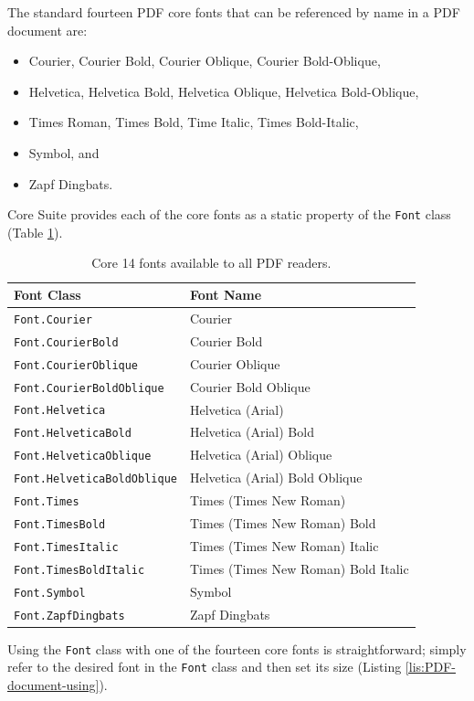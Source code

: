 \documentclass[american,letterpaper]{tufte-book}
\providecommand{\tabularnewline}{\\}
\numberwithin{equation}{section}
\numberwithin{figure}{section}
\begin{document}
{The standard fourteen PDF core fonts that can be referenced by name
in a PDF document are:
\begin{itemize}
\item Courier, Courier Bold, Courier Oblique, Courier Bold-Oblique,
\item Helvetica, Helvetica Bold, Helvetica Oblique, Helvetica Bold-Oblique,
\item Times Roman, Times Bold, Time Italic, Times Bold-Italic,
\item Symbol, and
\item Zapf Dingbats.
\end{itemize}
Core Suite provides each of the core fonts as a static property of
the \texttt{Font} class (Table \ref{tab:Core-14-fonts}).
\begin{table}[h]
\begin{tabular}{ll}
\toprule 
{\footnotesize Font Class} & {\footnotesize Font Name}\tabularnewline
\midrule
{\footnotesize\texttt{Font.Courier}} & {\footnotesize Courier}\tabularnewline
{\footnotesize\texttt{Font.CourierBold}} & {\footnotesize Courier Bold}\tabularnewline
{\footnotesize\texttt{Font.CourierOblique}} & {\footnotesize Courier Oblique}\tabularnewline
{\footnotesize\texttt{Font.CourierBoldOblique}} & {\footnotesize Courier Bold Oblique}\tabularnewline
{\footnotesize\texttt{Font.Helvetica}} & {\footnotesize Helvetica (Arial)}\tabularnewline
{\footnotesize\texttt{Font.HelveticaBold}} & {\footnotesize Helvetica (Arial) Bold}\tabularnewline
{\footnotesize\texttt{Font.HelveticaOblique}} & {\footnotesize Helvetica (Arial) Oblique}\tabularnewline
{\footnotesize\texttt{Font.HelveticaBoldOblique}} & {\footnotesize Helvetica (Arial) Bold Oblique}\tabularnewline
{\footnotesize\texttt{Font.Times}} & {\footnotesize Times (Times New Roman)}\tabularnewline
{\footnotesize\texttt{Font.TimesBold}} & {\footnotesize Times (Times New Roman) Bold}\tabularnewline
{\footnotesize\texttt{Font.TimesItalic}} & {\footnotesize Times (Times New Roman) Italic}\tabularnewline
{\footnotesize\texttt{Font.TimesBoldItalic}} & {\footnotesize Times (Times New Roman) Bold Italic}\tabularnewline
{\footnotesize\texttt{Font.Symbol}} & {\footnotesize Symbol}\tabularnewline
{\footnotesize\texttt{Font.ZapfDingbats}} & {\footnotesize Zapf Dingbats}\tabularnewline
\bottomrule
\end{tabular}\caption{Core 14 fonts available to all PDF readers.}\label{tab:Core-14-fonts}
\end{table}
\medskip
Using the \texttt{Font} class with one of the fourteen core fonts
is straightforward; simply refer to the desired font in the \texttt{Font}
class and then set its size (Listing \ref{lis:PDF-document-using}).

}
\end{document}
